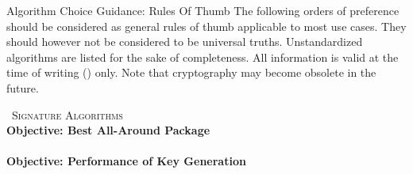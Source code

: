


\begin{minipage}[t]{0.7\textwidth}
    \vspace{0pt}
    \begin{algorithmbox}{Algorithm Choice Guidance: Rules Of Thumb}
        {\scriptsize The following orders of preference should be considered as general rules of thumb applicable to most use cases. They should however not be considered to be universal truths. Unstandardized algorithms are listed for the sake of completeness. All information is valid at the time of writing (\docdate) only. Note that cryptography may become obsolete in the future.\\}
        \begin{minipage}[t]{0.5\textwidth}
            \vspace{0pt}
            {\scshape \faPen\, Signature Algorithms}\\
            {\scriptsize \bfseries Objective: Best All-Around Package}\\[0.1\baselineskip]
            \\[0.75\baselineskip]
            {\scriptsize \bfseries Objective: Performance of Key Generation}\\[0.1\baselineskip]
            \\[0.75\baselineskip]

\end{minipage}
\end{algorithmbox}
\end{minipage}
